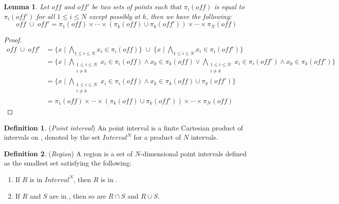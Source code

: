 \documentclass[acmlarge,review]{acmart}
\theoremstyle{definition}
\newtheorem{defn}{Definition}
\theoremstyle{plain}
\newtheorem{lem}{Lemma}
\theoremstyle{remark}
\begin{document}
\begin{lem}{}\label{lem:vector-union}
  Let $\mathit{off}$ and $\mathit{off'}$ be two sets of 
  points such that $\pi_i(\mathit{off})$ is equal to $\pi_i(\mathit{off'})$ for all $1
  \leq i \leq N$ except possibly at $k$, then we have the following:
%
  \begin{equation*}
    \mathit{off} \; \cup \; \mathit{off'}
    =
    \pi_1(\mathit{off}) \times \cdots \times
    (\pi_k(\mathit{off}) \cup \pi_k(\mathit{off'})) \times \cdots \times
    \pi_N(\mathit{off})
  \end{equation*}
\end{lem}
%
\begin{proof}
  \begin{align*}
    \mathit{off} \; \cup \; \mathit{off'} &
    = \{x \mid
      \bigwedge_{1 \leq i \leq N } x_i \in \pi_i(\mathit{off}) \}
      \;\cup\;
      \{x \mid
          \bigwedge_{1 \leq i \leq N } x_i \in \pi_i(\mathit{off'}) \} \\
    & = \{x \mid
          \bigwedge_{\substack{1 \leq i \leq N \\ i \neq k}}
            x_i \in \pi_i(\mathit{off}) \wedge x_k \in \pi_k(\mathit{off}) \vee
          \bigwedge_{\substack{1 \leq i \leq N \\ i \neq k}} x_i \in
            \pi_i(\mathit{off'}) \wedge x_k \in \pi_k(\mathit{off'})
        \} \\
    & = \{x \mid
          \bigwedge_{\substack{1 \leq i \leq N \\ i \neq k}} x_i \in
            \pi_i(\mathit{off}) \wedge
            x_k \in \pi_k(\mathit{off}) \cup \pi_k(\mathit{off'})
        \} \\
        & = \pi_1(\mathit{off}) \times \cdots \times
        (\pi_k(\mathit{off}) \cup \pi_k(\mathit{off'})) \times \cdots \times
        \pi_N(\mathit{off})
  \end{align*}
\end{proof}

\begin{defn}{(\emph{Point interval})}
An point interval is a finite Cartesian product of intervals on \zinf, 
denoted by the set $\textit{Interval}^N$ for a product of $N$ intervals.
\end{defn}

\begin{defn}{(\emph{Region})} 
  A region  is a set of $N$-dimensional point intervals defined as
  the smallest set satisfying the following:
%
  \begin{enumerate}
    \item If $R$ is in $\textit{Interval}^N$, then $R$ is in .
    \item If $R$ and $S$ are in , then so are $R \cap S$ and
      $R \cup S$.
  \end{enumerate}
\end{defn}
\end{document}
